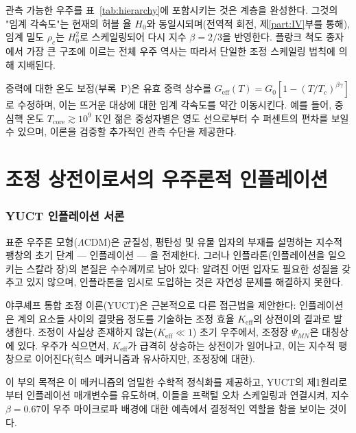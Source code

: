 \documentclass[11pt,a4paper]{article}
\newcommand{\Keff}{K_{\mathrm{eff}}}
\begin{document}
	관측 가능한 우주를 표~\ref{tab:hierarchy}에 포함시키는 것은 계층을 완성한다. 그것의 "임계 각속도"는 현재의 허블 율 \(H_0\)와 동일시되며(전역적 회전, 제\ref{part:IV}부를 통해), 임계 밀도 \(\rho_c\)는 \(H_0^2\)로 스케일링되어 다시 지수 \(\beta=2/3\)을 반영한다. 플랑크 척도 종자에서 가장 큰 구조에 이르는 전체 우주 역사는 따라서 단일한 조정 스케일링 법칙에 의해 지배된다.
	
	중력에 대한 온도 보정(부록~P)은 유효 중력 상수를 \(G_{\mathrm{eff}}(T) = G_0[1 - (T/T_c)^{\beta\gamma}]\)로 수정하며, 이는 뜨거운 대상에 대한 임계 각속도를 약간 이동시킨다. 예를 들어, 중심핵 온도 \(T_{\mathrm{core}} \gtrsim 10^9\) K인 젊은 중성자별은 영도 선으로부터 수 퍼센트의 편차를 보일 수 있으며, 이론을 검증할 추가적인 관측 수단을 제공한다.
	
	\part{조정 상전이로서의 우주론적 인플레이션}
	\label{part:III}
	
	\section{YUCT 인플레이션 서론}
	\label{sec:intro-inflation}
	
	표준 우주론 모형(\(\Lambda\)CDM)은 균질성, 평탄성 및 유물 입자의 부재를 설명하는 지수적 팽창의 초기 단계 — 인플레이션 — 을 전제한다. 그러나 인플라톤(인플레이션을 일으키는 스칼라 장)의 본질은 수수께끼로 남아 있다: 알려진 어떤 입자도 필요한 성질을 갖추고 있지 않으며, 인플라톤을 임시로 도입하는 것은 자연성 문제를 해결하지 못한다.
	
	야쿠셰프 통합 조정 이론(YUCT)은 근본적으로 다른 접근법을 제안한다: 인플레이션은 계의 요소들 사이의 결맞음 정도를 기술하는 조정 효율 \(\Keff\)의 상전이의 결과로 발생한다. 조정이 사실상 존재하지 않는(\(\Keff \ll 1\)) 초기 우주에서, 조정장 \(\Psi_{MN}\)은 대칭상에 있다. 우주가 식으면서, \(\Keff\)가 급격히 상승하는 상전이가 일어나고, 이는 지수적 팽창으로 이어진다(힉스 메커니즘과 유사하지만, 조정장에 대한).
	
	이 부의 목적은 이 메커니즘의 엄밀한 수학적 정식화를 제공하고, YUCT의 제1원리로부터 인플레이션 매개변수를 유도하며, 이들을 프랙털 오차 스케일링과 연결시켜, 지수 \(\beta = 0.67\)이 우주 마이크로파 배경에 대한 예측에서 결정적인 역할을 함을 보이는 것이다.
	
\end{document}
